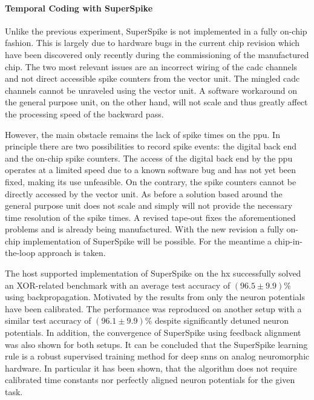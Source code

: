\paragraph{Temporal Coding with SuperSpike} Unlike the previous experiment, SuperSpike is not implemented in a fully on-chip fashion. This is largely due to hardware bugs in the current chip revision which have been discovered only recently during the commissioning of the manufactured chip. The two most relevant issues are an incorrect wiring of the \gls{cadc} channels and not direct accessible spike counters from the vector unit. The mingled \gls{cadc} channels cannot be unraveled using the vector unit. A software workaround on the general purpose unit, on the other hand, will not scale and thus greatly affect the processing speed of the backward pass.

However, the main obstacle remains the lack of spike times on the \gls{ppu}. In principle there are two possibilities to record spike events: the digital back end and the on-chip spike counters. The access of the digital back end by the \gls{ppu} operates at a limited speed due to a known software bug and has not yet been fixed, making its use unfeasible. On the contrary, the spike counters cannot be directly accessed by the vector unit. As before a solution based around the general purpose unit does not scale and simply will not provide the necessary time resolution of the spike times. A revised tape-out fixes the aforementioned problems and is already being manufactured. With the new revision a fully on-chip implementation of SuperSpike will be possible. For the meantime a chip-in-the-loop approach is taken.

The host supported implementation of SuperSpike on the \gls{hx} successfully solved an XOR-related benchmark with an average test accuracy of $(96.5 \pm 9.9) \%$ using backpropagation. Motivated by the results from \cite{wunderlich2019advantages} only the neuron potentials have been calibrated. The performance was reproduced on another setup with a similar test accuracy of $(96.1 \pm 9.9) \%$ despite significantly detuned neuron potentials. In addition, the convergence of SuperSpike using feedback alignment was also shown for both setups. It can be concluded that the SuperSpike learning rule is a robust supervised training method for deep \glspl{snn} on analog neuromorphic hardware. In particular it has been shown, that the algorithm does not require calibrated time constants nor perfectly aligned neuron potentials for the given task.

